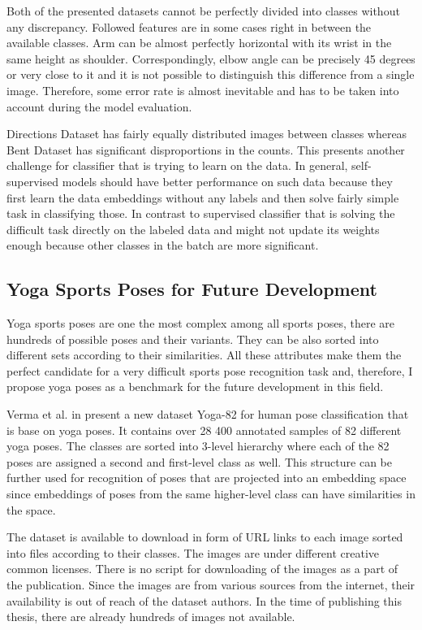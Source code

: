 Both of the presented datasets cannot be perfectly divided into classes without any discrepancy. Followed features are in some cases right in between the available classes. Arm can be almost perfectly horizontal with its wrist in the same height as shoulder. Correspondingly, elbow angle can be precisely 45 degrees or very close to it and it is not possible to distinguish this difference from a single image. Therefore, some error rate is almost inevitable and has to be taken into account during the model evaluation.

Directions Dataset has fairly equally distributed images between classes whereas Bent Dataset has significant disproportions in the counts. This presents another challenge for classifier that is trying to learn on the data. In general, self-supervised models should have better performance on such data because they first learn the data embeddings without any labels and then solve fairly simple task in classifying those. In contrast to supervised classifier that is solving the difficult task directly on the labeled data and might not update its weights enough because other classes in the batch are more significant.

\subsection{Yoga Sports Poses for Future Development}

Yoga sports poses are one the most complex among all sports poses, there are hundreds of possible poses and their variants. They can be also sorted into different sets according to their similarities. All these attributes make them the perfect candidate for a very difficult sports pose recognition task and, therefore, I propose yoga poses as a benchmark for the future development in this field.

Verma et al. in \cite{verma2020yoga} present a new dataset Yoga-82 for human pose classification that is base on yoga poses. It contains over 28 400 annotated samples of 82 different yoga poses. The classes are sorted into 3-level hierarchy where each of the 82 poses are assigned a second and first-level class as well. This structure can be further used for recognition of poses that are projected into an embedding space since embeddings of poses from the same higher-level class can have similarities in the space.

The dataset is available to download in form of URL links to each image sorted into files according to their classes. The images are under different creative common licenses. There is no script for downloading of the images as a part of the publication. Since the images are from various sources from the internet, their availability is out of reach of the dataset authors. In the time of publishing this thesis, there are already hundreds of images not available.

